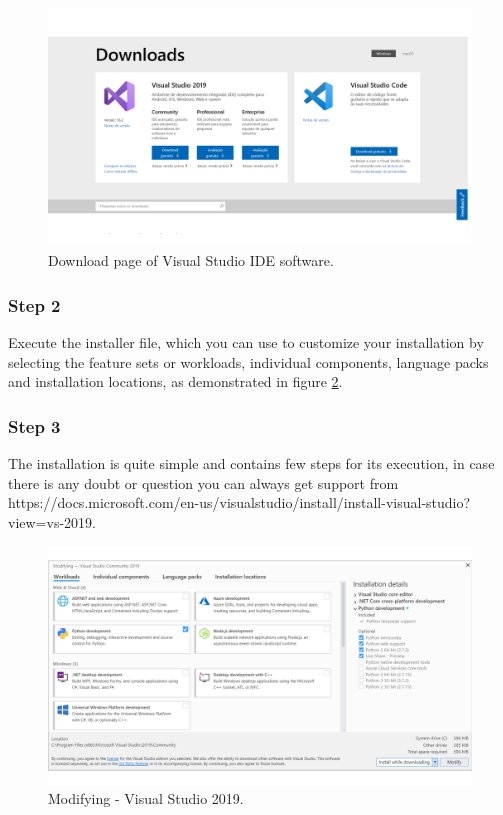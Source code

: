 \begin{refsection}
	\begin{figure}[H]
		\centering
		\includegraphics[width=1\linewidth]{./sdf/arduino_quantum_rx/figures/vsDownload.pdf}
		\caption{Download page of Visual Studio IDE software.}
		\label{vstudio}
	\end{figure}
	
	
	\subsubsection{Step 2}
	
	Execute the installer file, which you can use to customize your installation by selecting the feature sets or workloads, individual components, language packs and installation locations, as demonstrated in figure \ref{vstudioWorkloads}.
	
	
	
	\subsubsection{Step 3}
	
	The installation is quite simple and contains few steps for its execution, in case there is any doubt or question you can always get support from https://docs.microsoft.com/en-us/visualstudio/install/install-visual-studio?view=vs-2019.
	
	\begin{figure}[H]
		\centering
		\includegraphics[width=1\linewidth]{./sdf/arduino_quantum_rx/figures/VSworkloads.pdf}
		\caption{Modifying - Visual Studio 2019.}
		\label{vstudioWorkloads}
	\end{figure}
	

\end{refsection}
